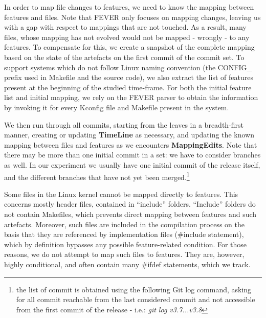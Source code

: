 In order to map file changes to features, we need to know the mapping between features and files.
Note that FEVER only focuses on mapping changes, leaving us with a gap with respect to mappings that are not touched.
As a result, many files, whose mapping has not evolved would not be mapped - wrongly - to any features.
To compensate for this, we create a snapshot of the complete mapping based on the state of the artefacts on the first commit of the commit set.
To support systems which do not follow Linux naming convention (the CONFIG\_ prefix used in Makefile and the source code), 
we also extract the list of features present at the beginning of the studied time-frame.
For both the initial feature list and initial mapping, 
we rely on the FEVER parser to obtain the information by invoking it for every Kconfig file and Makefile present in the system. 

We then run through all commits, starting from the leaves in a breadth-first manner, creating or updating \textbf{TimeLine} as necessary,
and updating the known mapping between files and features as we encounters \textbf{MappingEdits}.
Note that there may be more than one initial commit in a set: we have to consider branches as well. In our experiment we usually have
one initial commit of the release itself, and the different branches that have not yet been merged.\footnote{the list of commit is obtained using the following Git log command, asking for all commit reachable from the last considered commit and not accessible from the first commit of the release - i.e.: \textit{git log v3.7...v3.8}} 

Some files in the Linux kernel cannot be mapped directly to features. 
This concerns mostly header files, contained in ``include'' folders.
``Include'' folders do not contain Makefiles, which prevents direct mapping between features and such artefacts.
Moreover, such files are included in the compilation process on the basis that they are referenced by implementation files (\#include statement), 
which by definition bypasses any possible feature-related condition.
For those reasons, we do not attempt to map such files to features.
They are, however, highly conditional, and often contain many \#ifdef statements, which we track.
